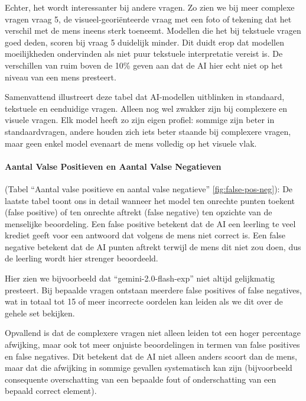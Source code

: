 \documentclass[12pt]{article}
\begin{document}
\begin{multicols}{2}
Echter, het wordt interessanter bij andere vragen. Zo zien we bij meer complexe vragen vraag 5, de visueel-georiënteerde vraag met een foto of tekening dat het verschil met de mens ineens sterk toeneemt. Modellen die het bij tekstuele vragen goed deden, scoren bij vraag 5 duidelijk minder. Dit duidt erop dat modellen moeilijkheden ondervinden als niet puur tekstuele interpretatie vereist is. De verschillen van ruim boven de 10\% geven aan dat de AI hier echt niet op het niveau van een mens presteert.

Samenvattend illustreert deze tabel dat AI-modellen uitblinken in standaard, tekstuele en eenduidige vragen. Alleen nog wel zwakker zijn bij complexere en visuele vragen. Elk model heeft zo zijn eigen profiel: sommige zijn beter in standaardvragen, andere houden zich iets beter staande bij complexere vragen, maar geen enkel model evenaart de mens volledig op het visuele vlak.

\paragraph{Aantal Valse Positieven en Aantal Valse Negatieven} (Tabel “Aantal valse positieve en aantal valse negatieve” \ref{fig:false-pos-neg}):
De laatste tabel toont ons in detail wanneer het model ten onrechte punten toekent (false positive) of ten onrechte aftrekt (false negative) ten opzichte van de menselijke beoordeling. Een false positive betekent dat de AI een leerling te veel krediet geeft voor een antwoord dat volgens de mens niet correct is. Een false negative betekent dat de AI punten aftrekt terwijl de mens dit niet zou doen, dus de leerling wordt hier strenger beoordeeld.

Hier zien we bijvoorbeeld dat “gemini-2.0-flash-exp” niet altijd gelijkmatig presteert. Bij bepaalde vragen ontstaan meerdere false positives of false negatives, wat in totaal tot 15 of meer incorrecte oordelen kan leiden als we dit over de gehele set bekijken.

Opvallend is dat de complexere vragen niet alleen leiden tot een hoger percentage afwijking, maar ook tot meer onjuiste beoordelingen in termen van false positives en false negatives. Dit betekent dat de AI niet alleen anders scoort dan de mens, maar dat die afwijking in sommige gevallen systematisch kan zijn (bijvoorbeeld consequente overschatting van een bepaalde fout of onderschatting van een bepaald correct element).


\end{multicols}
\end{document}
